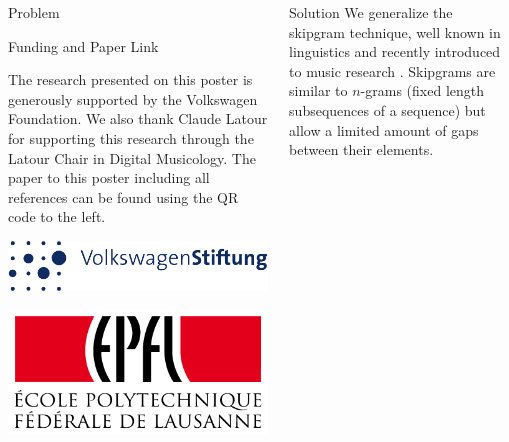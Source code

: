 \documentclass[final]{beamer}
\begin{document}
\begin{frame}[t]
\begin{columns}[t]
\begin{column}{0.3\textwidth}
\begin{block}{Problem}
      \end{block}

      \vspace{5em}

      \begin{block}{Funding and Paper Link}
        \begin{figure}
          \begin{center}
          \end{center}
        \end{figure}
        \small
        The research presented on this poster is generously
        supported by the Volkswagen Foundation.  We also thank
        Claude Latour for supporting this research through the
        Latour Chair in Digital Musicology.  The paper to this
        poster including all references can be found using the QR
        code to the left.
        
        
        \includegraphics[width=\textwidth]{img/vw.pdf}
        
        \includegraphics[width=\textwidth]{img/Logo_EPFL.pdf}
      \end{block}
    \end{column}
    
    \begin{column}{0.3\textwidth}
      \begin{block}{Solution}
        We generalize the \alert{skipgram technique},
        well known in linguistics \autocite{GuthrieCloserLookSkipGram2006}
        and recently introduced to music research \autocite{SearsModelingHarmonySkipGrams2017}.
        Skipgrams are similar to $n$-grams (fixed length subsequences of a sequence)
        but allow a limited amount of \alert{gaps} between their elements.


\end{block}
\end{column}
\end{columns}
\end{frame}
\end{document}
